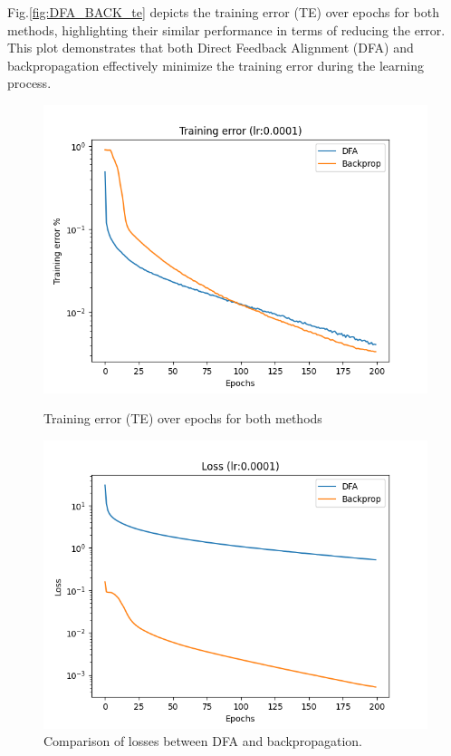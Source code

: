 \documentclass[english]{article}
\begin{document}
Fig.\ref{fig:DFA_BACK_te} depicts the training error (TE) over epochs for both methods, highlighting their similar performance in terms of reducing the error. This plot demonstrates that both Direct Feedback Alignment (DFA) and backpropagation effectively minimize the training error during the learning process.


\begin{figure}[!h]
    \centering
    \begin{minipage}{0.48\textwidth}
        \includegraphics[width=\linewidth]{rsc/DFA_BACK/DFA_Back_COMP_TE.png}
        \caption{Training error (TE) over epochs for both methods}\label{fig:DFA_BACK_te}
    \end{minipage}%
    \hfill
    \begin{minipage}{0.48\textwidth}
        \includegraphics[width=\linewidth]{rsc/DFA_BACK/DFA_Back_COMP_LOSS.png}
        \caption{Comparison of losses between DFA and backpropagation.}\label{fig:DFA_BACK_loss}
    \end{minipage}%
\end{figure}
\end{document}
